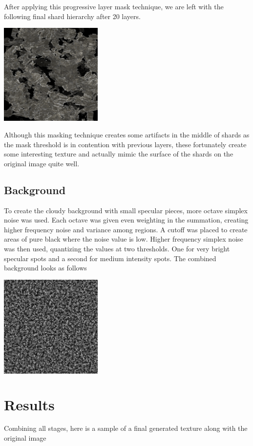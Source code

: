 \documentclass[a4paper, 11pt, titlepage]{article}
\begin{document}
After applying this progressive layer mask technique, we are left with the following final shard
hierarchy after 20 layers.

 {
    \includegraphics[width=2.0in]{images/no-background.png}
}

Although this masking technique creates some artifacts in the middle of shards
as the mask threshold is in contention with previous layers, these fortunately
create some interesting texture and actually mimic the surface of the shards on
the original image quite well.
\subsection{Background}

To create the cloudy background with small specular pieces, more octave simplex
noise was used. Each octave was given even weighting in the summation, creating
higher frequency noise and variance among regions. A cutoff was placed to create
areas of pure black where the noise value is low. Higher frequency simplex noise
was then used, quantizing the values at two thresholds. One for very bright
specular spots and a second for medium intensity spots. The combined background
looks as follows

 {
    \includegraphics[width=2.0in]{images/background.png}
}

\section{Results}
Combining all stages, here is a sample of a final generated texture along with
the original image
\end{document}
